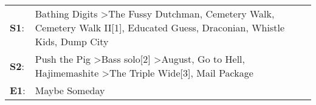 \begin{supertabular}{p{0.03\textwidth}p{0.92\textwidth}}
 \textbf{S1}:  &  Bathing Digits\textsuperscript{} \textgreater \enspace The Fussy Dutchman\textsuperscript{}, \enspace Cemetery Walk\textsuperscript{}, \enspace Cemetery Walk II[1]\textsuperscript{}, \enspace Educated Guess\textsuperscript{}, \enspace Draconian\textsuperscript{}, \enspace Whistle Kids\textsuperscript{}, \enspace Dump City\textsuperscript{}  \enspace  \\
 \textbf{S2}:  &                                Push the Pig\textsuperscript{} \textgreater \enspace Bass solo[2]\textsuperscript{} \textgreater \enspace August\textsuperscript{}, \enspace Go to Hell\textsuperscript{}, \enspace Hajimemashite\textsuperscript{} \textgreater \enspace The Triple Wide[3]\textsuperscript{}, \enspace Mail Package\textsuperscript{}  \enspace  \\
 \textbf{E1}:  &                                                                                                                                                                                                                                                                                                                        Maybe Someday\textsuperscript{}  \enspace  \\
\end{supertabular}
